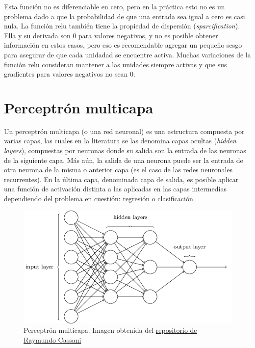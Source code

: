 \indent Esta función no es diferenciable en cero, pero en la práctica esto no es un problema dado a que la
probabilidad de que una entrada sea igual a cero es casi nula. La función \acrshort{relu} también tiene la propiedad
de dispersión (\textit{sparcification}). Ella y su derivada son 0 para valores negativos, y no es posible obtener
información en estos casos, pero eso es recomendable agregar un pequeño sesgo para asegurar de que cada unidadad se
encuentre activa. Muchas variaciones de la función \acrshort{relu} consideran mantener a las unidades siempre
activas y que sus gradientes para valores negativos no sean 0.

\section{Perceptrón multicapa}

\indent Un perceptrón multicapa (o una red neuronal) es una estructura compuesta por varias capas, las cuales en la
literatura se las denomina capas ocultas (\textit{hidden layers}), compuestas por neuronas donde su salida son la
entrada de las neuronas de la siguiente capa. Más aún, la salida de una neurona puede ser la entrada de otra neurona
de la misma o anterior capa (es el caso de las redes neuronales recurrentes). En la última capa, denominada capa de
salida, es posible aplicar una función de activación distinta a las aplicadas en las capas intermedias dependiendo
del problema en cuestión: regresión o clasificación.

\begin{figure}[H]
  \centering
  \includegraphics[scale=0.6]{sections/chapter-06/images/mlp-network.png}
  \caption[Perceptrón multicapa]{Perceptrón multicapa. Imagen obtenida del \href{https://github
  .com/rcassani/mlp-example}{repositorio de Raymundo Cassani}}
  \label{fig:mlp_net}
\end{figure}

